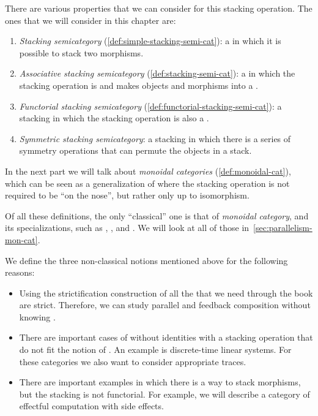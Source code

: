 There are various properties that we can consider for this stacking operation.
The ones that we will consider in this chapter are:
%
\begin{enumerate}
    \item \emph{Stacking semicategory} (\cref{def:simple-stacking-semi-cat}): a  in which it is possible to stack two morphisms.
    \item \emph{Associative stacking semicategory} (\cref{def:stacking-semi-cat}): a  in which the stacking operation is  and makes objects and morphisms into a .
    \item \emph{Functorial stacking semicategory} (\cref{def:functorial-stacking-semi-cat}): a stacking  in which the stacking operation is also a .
    \item \emph{Symmetric stacking semicategory}: a stacking  in which there is a series of symmetry operations that can permute the objects in a stack.
\end{enumerate}
%
In the next part we will talk about \emph{monoidal categories} (\cref{def:monoidal-cat}), which can be seen as a generalization of   where the stacking operation is not required to be  ``on the nose'', but rather only up to isomorphism.


\begin{remark}
    Of all these definitions, the only ``classical'' one is that of \emph{monoidal category}, and its specializations, such as , , and .
    We will look at all of those in~\cref{sec:parallelism-mon-cat}.

    We define the three non-classical notions mentioned above for the following reasons:
    \begin{itemize}
        \item Using the strictification construction of \SetL all the  that we need through the book are strict.
              Therefore, we can study parallel and feedback composition without knowing .

        \item There are important cases of  without identities with a stacking operation that do not fit the notion of .
              An example is discrete-time linear systems.
              For these categories we also want to consider appropriate traces.
        \item There are important examples in which there is a way to stack morphisms, but the stacking is not functorial.
              For example, we will describe a category of effectful computation with side effects.
    \end{itemize}
\end{remark}

